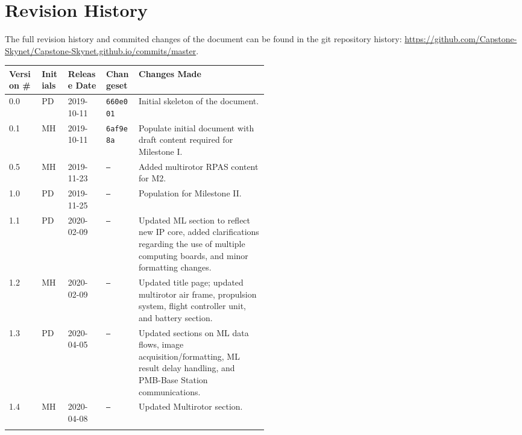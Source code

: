 \section*{Revision History}
The full revision history and commited changes of the document can be found in the git repository history: \href{https://github.com/Capstone-Skynet/Capstone-Skynet.github.io}{https://github.com/Capstone-Skynet/Capstone-Skynet.github.io/commits/master}.

\begin{table}[H]
\begin{tabular}{*{4}{l}p{0.5\linewidth}}
\hline
Version \# & Initials & Release Date & Changeset & Changes Made \\ \hline

0.0 & PD & 2019-10-11 & \texttt{660e001} & Initial skeleton of the document.\\
0.1 & MH & 2019-10-11 & \texttt{6af9e8a} & Populate initial document with draft content required for Milestone I.\\
0.5 & MH & 2019-11-23 & \texttt{--} & Added multirotor RPAS content for M2.\\
1.0 & PD & 2019-11-25 & \texttt{--} & Population for Milestone II.\\ 
1.1 & PD & 2020-02-09 & \texttt{--} & Updated ML section to reflect new IP core, added clarifications regarding the use of multiple computing boards, and minor formatting changes.\\ 
1.2 & MH & 2020-02-09 & \texttt{--} & Updated title page; updated multirotor air frame, propulsion system, flight controller unit, and battery section.\\ 
1.3 & PD & 2020-04-05 & \texttt{--} & Updated sections on ML data flows, image acquisition/formatting, ML result delay handling, and PMB-Base Station communications.\\ 
1.4 & MH & 2020-04-08 & \texttt{--} & Updated Multirotor section.\\ 

 & & & \\ \hline
\end{tabular}
\end{table}
